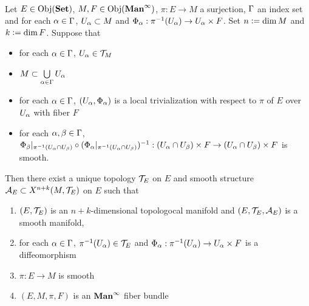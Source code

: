 \documentclass{book}
\begin{document}
	\begin{ex}   \\
		Let $E \in \operatorname{Obj}(\operatorname*{\text{\textbf{Set}}})$, $M, F \in \operatorname{Obj}(\operatorname*{\text{\textbf{Man}}^{\infty}})$, $\pi: E \rightarrow M$ a surjection, $\Gamma$ an index set and for each $\alpha \in \Gamma$, $U_{\alpha} \subset M$ and $\Phi_{\alpha}: \pi^{-1}(U_{\alpha}) \rightarrow U_{\alpha} \times F$. Set $n \vcentcolon= \dim M$ and $k \vcentcolon= \dim F$. Suppose that 
		\begin{itemize}
			\item for each $\alpha \in \Gamma$, $U_{\alpha} \in \mathcal{T}_M$
			\item $M \subset \bigcup\limits_{\alpha \in \Gamma} U_{\alpha}$ 
			\item for each $\alpha \in \Gamma$, $(U_{\alpha}, \Phi_{\alpha})$ is a local trivialization with respect to $\pi$ of $E$ over $U_{\alpha}$ with fiber $F$ 
			\item for each $\alpha,\beta \in \Gamma$, $\Phi_{\beta}|_{\pi^{-1}(U_{\alpha} \cap U_{\beta})} \circ (\Phi_{\alpha}|_{\pi^{-1}(U_{\alpha} \cap U_{\beta})})^{-1}: (U_{\alpha} \cap U_{\beta}) \times F \rightarrow  (U_{\alpha} \cap U_{\beta}) \times F$ is smooth.
		\end{itemize}
		Then there exist a unique topology $\mathcal{T}_E$ on $E$ and smooth structure $\mathcal{A}_E \subset X^{n+k}(M, \mathcal{T}_E)$ on $E$ such that
		\begin{enumerate}
			\item $(E, \mathcal{T}_E)$ is an $n+k$-dimensional topologocal manifold and $(E, \mathcal{T}_E, \mathcal{A}_E)$ is a smooth manifold,
			\item for each $\alpha \in \Gamma$, $ \pi^{-1}(U_{\alpha}) \in \mathcal{T}_E$ and $\Phi_{\alpha}: \pi^{-1}(U_{\alpha}) \rightarrow U_{\alpha} \times F$ is a diffeomorphism
			\item $\pi: E \rightarrow M$ is smooth
			\item $(E, M, \pi, F)$ is an $\operatorname*{\text{\textbf{Man}}^{\infty}}$ fiber bundle
		\end{enumerate}
	\end{ex}
\end{document}
